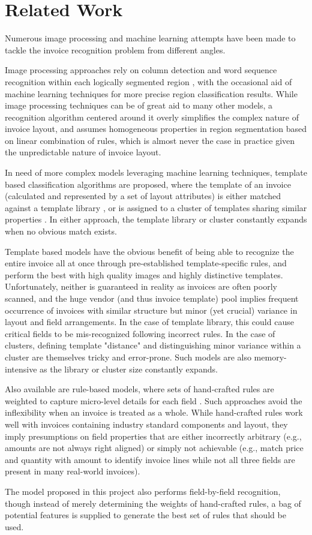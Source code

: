 \section{Related Work}
Numerous image processing and machine learning attempts have been made to tackle the invoice recognition problem from different angles. 

Image processing approaches rely on column detection and word sequence recognition within each logically segmented region \cite{marinai2008introduction}, with the occasional aid of machine learning techniques for more precise region classification results. While image processing techniques \cite{zhou2000hough} can be of great aid to many other models, a recognition algorithm centered around it overly simplifies the complex nature of invoice layout, and assumes homogeneous properties in region segmentation based on linear combination of rules, which is almost never the case in practice given the unpredictable nature of invoice layout.

In need of more complex models leveraging machine learning techniques, template based classification algorithms are proposed, where the template of an invoice (calculated and represented by a set of layout attributes) is either matched against a template library \cite{ming2003research}\cite{sorio2013machine}, or is assigned to a cluster of templates sharing similar properties \cite{hamza2008incremental}. In either approach, the template library or cluster constantly expands when no obvious match exists.

Template based models have the obvious benefit of being able to recognize the entire invoice all at once through pre-established template-specific rules, and perform the best with high quality images and highly distinctive templates. Unfortunately, neither is guaranteed in reality as invoices are often poorly scanned, and the huge vendor (and thus invoice template) pool implies frequent occurrence of invoices with similar structure but minor (yet crucial) variance in layout and field arrangements. In the case of template library, this could cause critical fields to be mis-recognized following incorrect rules. In the case of clusters, defining template "distance" and distinguishing minor variance within a cluster are themselves tricky and error-prone. Such models are also memory-intensive as the library or cluster size constantly expands.

Also available are rule-based models, where sets of hand-crafted rules are weighted to capture micro-level details for each field \cite{belaid2004morphological}. Such approaches avoid the inflexibility when an invoice is treated as a whole. While hand-crafted rules work well with invoices containing industry standard components and layout, they imply presumptions on field properties that are either incorrectly arbitrary (e.g., amounts are not always right aligned) or simply not achievable (e.g., match price and quantity with amount to identify invoice lines while not all three fields are present in many real-world invoices).

The model proposed in this project also performs field-by-field recognition, though instead of merely determining the weights of hand-crafted rules, a bag of potential features is supplied to generate the best set of rules that should be used.
